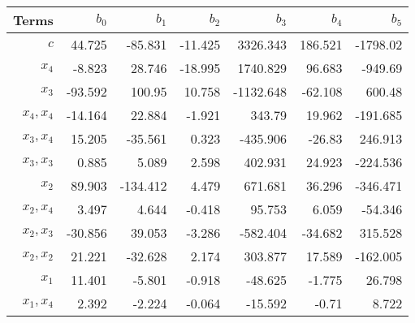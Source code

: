 \begin{tabular}{rrrrrrr}
Terms & $b_0$ & $b_1$ & $b_2$ & $b_3$ & $b_4$ & $b_5$ \\ 
\hline 
$c$ & 44.725 & -85.831 & -11.425 & 3326.343 & 186.521 & -1798.02 \\ 
$x_4$ & -8.823 & 28.746 & -18.995 & 1740.829 & 96.683 & -949.69 \\ 
$x_3$ & -93.592 & 100.95 & 10.758 & -1132.648 & -62.108 & 600.48 \\ 
$x_4,x_4$ & -14.164 & 22.884 & -1.921 & 343.79 & 19.962 & -191.685 \\ 
$x_3,x_4$ & 15.205 & -35.561 & 0.323 & -435.906 & -26.83 & 246.913 \\ 
$x_3,x_3$ & 0.885 & 5.089 & 2.598 & 402.931 & 24.923 & -224.536 \\ 
$x_2$ & 89.903 & -134.412 & 4.479 & 671.681 & 36.296 & -346.471 \\ 
$x_2,x_4$ & 3.497 & 4.644 & -0.418 & 95.753 & 6.059 & -54.346 \\ 
$x_2,x_3$ & -30.856 & 39.053 & -3.286 & -582.404 & -34.682 & 315.528 \\ 
$x_2,x_2$ & 21.221 & -32.628 & 2.174 & 303.877 & 17.589 & -162.005 \\ 
$x_1$ & 11.401 & -5.801 & -0.918 & -48.625 & -1.775 & 26.798 \\ 
$x_1,x_4$ & 2.392 & -2.224 & -0.064 & -15.592 & -0.71 & 8.722 \\ 
\hline 
\end{tabular}